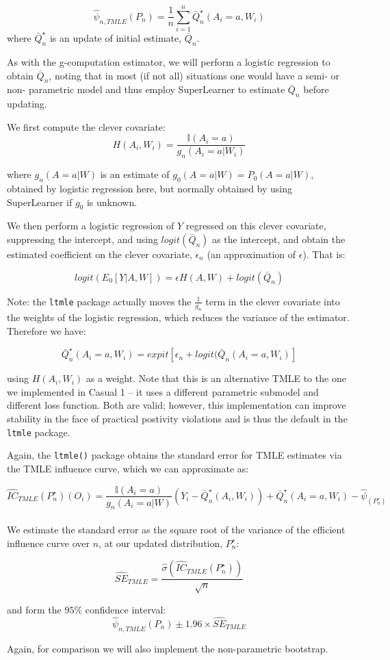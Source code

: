 \documentclass[answers]{exam}
\begin{document}
\begin{enumerate}
\[
\hat{\psi}_{n, TMLE}(P_{n})=\frac{1}{n}\sum_{i=1}^{n}\bar{Q}_{n}^{\star}(A_i=a,W_{i})
\]
 where $\bar{Q}_{n}^{\star}$ is an update of initial estimate, $\bar{Q}_{n}$. 
 
As with the g-computation estimator, we will perform a logistic regression to obtain $\bar{Q}_{n}$, noting that in most (if not all) situations one would have a semi- or non- parametric model and thus employ SuperLearner to estimate $\bar{Q}_{n}$ before updating.

We first compute the clever covariate:
\[
H(A_{i},W_{i})=\frac{\mathbb{I}(A_{i}=a)}{g_{n}(A_{i}=a\vert W_{i})}
\]

where $g_{n}(A=a\vert W)$ is an estimate of $g_{0}(A=a\vert W)=P_{0}(A=a\vert W)$, obtained by logistic regression here, but normally obtained by using SuperLearner if $g_{0}$ is unknown.

We then perform a logistic regression of $Y$ regressed on this clever covariate, suppressing the intercept, and using $logit(\bar{Q}_{n})$ as the intercept, and obtain the estimated coefficient on the clever covariate,  $\epsilon_{n}$ (an approximation of $\epsilon$). That is:

\[
logit\left(E_{0}[Y\vert A,W]\right)=\epsilon H(A,W)+logit(\bar{Q}_{n})
\]
 
Note: the \texttt{ltmle} package actually moves the $\frac{1}{g_n}$ term in the clever covariate into the weights of the logistic regression, which reduces the variance of the estimator. Therefore we have:

\[
\bar{Q}_{n}^{\star}(A_{i}=a,W_{i})=expit[\epsilon_{n} + logit(\bar{Q}_{n}(A_{i}=a,W_{i})]
\]

using $H(A_i,W_i)$ as a weight. Note that this is an alternative TMLE to the one we implemented in Casual 1 -- it uses a different parametric submodel and different loss function. Both are valid; however, this implementation can improve stability in the face of practical postivity violations and is thus the default in the \texttt{ltmle} package.

Again, the \texttt{ltmle()} package obtains the standard error for TMLE estimates via the TMLE influence curve, which we can approximate as:

\[
\hat{IC}_{TMLE}(P_{n}^{\star})(O_i)=\frac{\mathbb{I}(A_i=a)}{g_{n}(A_i=a\vert W)}(Y_i-\bar{Q}_{n}^{\star}(A_i,W_i))+\bar{Q}_{n}^{\star}(A_i=a,W_i)-\hat{\psi}_{(P_{n}^{\star})}
\]\\


We estimate the standard error as the square root of the variance of the efficient influence curve over $n$, at our updated distribution, $P_{n}^{\star}$:

\[
\hat{SE}_{TMLE}=\frac{\hat{\sigma}\left(\hat{IC}_{TMLE}(P_{n}^{\star})\right)}{\sqrt{n}}
\]

and form the $95\%$ confidence interval:
\[
\hat{\psi}_{n, TMLE}(P_{n})\pm 1.96\times \hat{SE}_{TMLE}
\]

Again, for comparison we will also implement the non-parametric bootstrap.

\end{enumerate}
\end{document}
